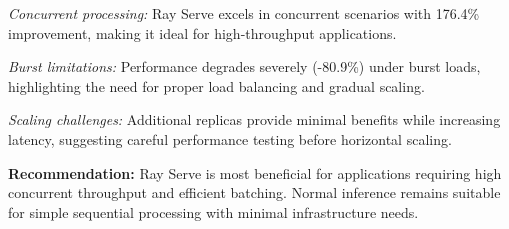 \textit{Concurrent processing:} Ray Serve excels in concurrent scenarios with 176.4\% improvement, making it ideal for high-throughput applications.

\textit{Burst limitations:} Performance degrades severely (-80.9\%) under burst loads, highlighting the need for proper load balancing and gradual scaling.

\textit{Scaling challenges:} Additional replicas provide minimal benefits while increasing latency, suggesting careful performance testing before horizontal scaling.

\textbf{Recommendation:} Ray Serve is most beneficial for applications requiring high concurrent throughput and efficient batching. Normal inference remains suitable for simple sequential processing with minimal infrastructure needs.
